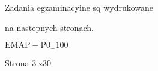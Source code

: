 \documentclass[a4paper,12pt]{article}
\begin{document}
Zadania egzaminacyine sq wydrukowane

na nastepnych stronach.

$\mathrm{E}\mathrm{M}\mathrm{A}\mathrm{P}-\mathrm{P}0_{-}100$

Strona 3 z30
\end{document}
